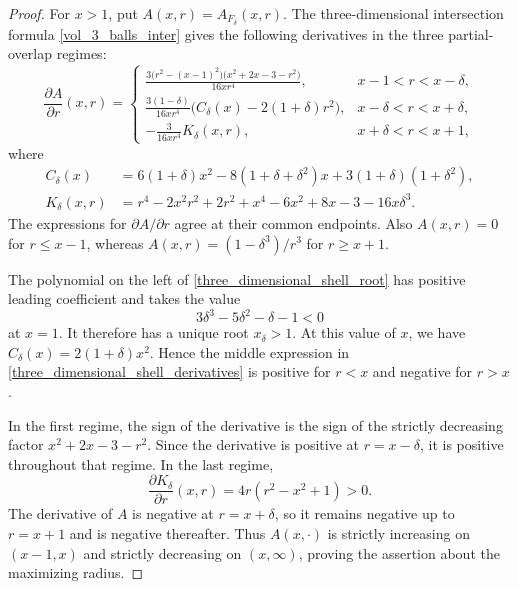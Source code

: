 \documentclass[12pt]{amsart}
\numberwithin{equation}{section}
\begin{document}
\begin{proof}
For $x>1$, put $A(x,r)=A_{F_\delta}(x,r)$. The three-dimensional
intersection formula \eqref{vol_3_balls_inter} gives the following
derivatives in the three partial-overlap regimes:
\begin{equation}
\label{three_dimensional_shell_derivatives}
\frac{\partial A}{\partial r}(x,r)=
\begin{cases}
\displaystyle
\frac{3\bigl(r^2-(x-1)^2\bigr)
              \bigl(x^2+2x-3-r^2\bigr)}{16xr^4},
 &x-1<r<x-\delta,\\[8pt]
\displaystyle
\frac{3(1-\delta)}{16xr^4}
       \bigl(C_\delta(x)-2(1+\delta)r^2\bigr),
 &x-\delta<r<x+\delta,\\[8pt]
\displaystyle -\frac{3}{16xr^4}K_\delta(x,r),
 &x+\delta<r<x+1,
\end{cases}
\end{equation}
where
\begin{align*}
C_\delta(x)
 &=6(1+\delta)x^2-8(1+\delta+\delta^2)x
       +3(1+\delta)(1+\delta^2),\\
K_\delta(x,r)
 &=r^4-2x^2r^2+2r^2+x^4-6x^2+8x-3-16x\delta^3.
\end{align*}
The expressions for $\partial A/\partial r$ agree at their common
endpoints. Also $A(x,r)=0$ for $r\leq x-1$, whereas
$A(x,r)=(1-\delta^3)/r^3$ for $r\geq x+1$.

The polynomial on the left of \eqref{three_dimensional_shell_root}
has positive leading coefficient and takes the value
\[
3\delta^3-5\delta^2-\delta-1<0
\]
at $x=1$. It therefore has a unique root $x_\delta>1$.
At this value of $x$, we have
$C_\delta(x)=2(1+\delta)x^2$. Hence the middle expression in
\eqref{three_dimensional_shell_derivatives} is positive for $r<x$
and negative for $r>x$.

In the first regime, the sign of the derivative is the sign of the
strictly decreasing factor $x^2+2x-3-r^2$. Since the derivative is
positive at $r=x-\delta$, it is positive throughout that regime.
In the last regime,
\[
\frac{\partial K_\delta}{\partial r}(x,r)
   =4r(r^2-x^2+1)>0.
\]
The derivative of $A$ is negative at $r=x+\delta$, so it remains
negative up to $r=x+1$ and is negative thereafter. Thus $A(x,\cdot)$
is strictly increasing on $(x-1,x)$ and strictly decreasing on
$(x,\infty)$, proving the assertion about the maximizing radius.


\end{proof}
\end{document}

